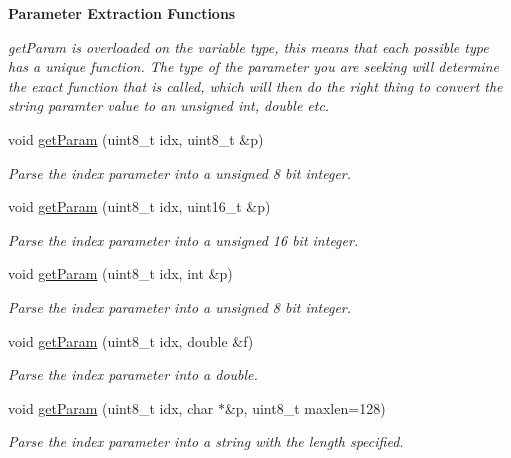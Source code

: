 \begin{Indent}{\bf Parameter Extraction Functions}\par
{\em getParam is overloaded on the variable type, this means that each possible type has a unique function. The type of the parameter you are seeking will determine the exact function that is called, which will then do the right thing to convert the string paramter value to an unsigned int, double etc. }\begin{DoxyCompactItemize}
\item 
void \hyperlink{class_cmd_processor_a904eb6afbd77b68ec05d9c9043d4e0de}{getParam} (uint8\_\-t idx, uint8\_\-t \&p)
\begin{DoxyCompactList}\small\item\em Parse the index parameter into a unsigned 8 bit integer. \item\end{DoxyCompactList}\item 
void \hyperlink{class_cmd_processor_a6ecb6c34b183926aeb224b660eb03b73}{getParam} (uint8\_\-t idx, uint16\_\-t \&p)
\begin{DoxyCompactList}\small\item\em Parse the index parameter into a unsigned 16 bit integer. \item\end{DoxyCompactList}\item 
void \hyperlink{class_cmd_processor_a8cac703be39a93f638732e67b361fea0}{getParam} (uint8\_\-t idx, int \&p)
\begin{DoxyCompactList}\small\item\em Parse the index parameter into a unsigned 8 bit integer. \item\end{DoxyCompactList}\item 
void \hyperlink{class_cmd_processor_aa0a295be3ce1557d86c5cc98394c3da1}{getParam} (uint8\_\-t idx, double \&f)
\begin{DoxyCompactList}\small\item\em Parse the index parameter into a double. \item\end{DoxyCompactList}\item 
void \hyperlink{class_cmd_processor_a3d0f2ffbbf0400d21c957da7c92109d5}{getParam} (uint8\_\-t idx, char $\ast$\&p, uint8\_\-t maxlen=128)
\begin{DoxyCompactList}\small\item\em Parse the index parameter into a string with the length specified. \item\end{DoxyCompactList}\end{DoxyCompactItemize}
\end{Indent}
